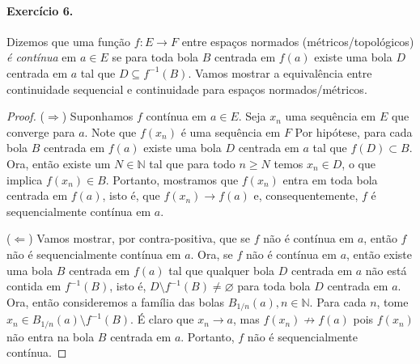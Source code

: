 \documentclass[12pt,a4paper]{article}
\begin{document}
\paragraph{Exercício 6.} Dizemos que uma função $f: E \to F$ entre espaços normados (métricos/topológicos) \textit{é contínua}
em $a\in E$ se para toda bola $B$ centrada em $f(a)$ existe uma bola $D$ centrada em $a$ tal que $D \subseteq f^{-1}(B)$. Vamos
mostrar a equivalência entre continuidade sequencial e continuidade para espaços normados/métricos.
\begin{proof}
($\Rightarrow$) Suponhamos $f$ contínua em $a\in E$. Seja $x_n$ uma sequência em $E$ que converge para $a$. Note que $f(x_n)$ 
é uma sequência em $F$ Por hipótese, para cada bola $B$ centrada em $f(a)$ existe uma bola $D$ centrada em $a$ tal que 
$f(D) \subset B$. Ora, então existe um $N\in\mathbb{N}$ tal que para todo $n\geq N$ temos $x_n \in D$, 
o que implica $f(x_n) \in B$. Portanto, mostramos que $f(x_n)$ entra em toda bola centrada em $f(a)$, isto é, que
$f(x_n) \to f(a)$ e, consequentemente, $f$ é sequencialmente contínua em $a$.

($\Leftarrow$) Vamos mostrar, por contra-positiva, que se $f$ não é contínua em $a$, então $f$ não é sequencialmente contínua em $a$. 
Ora, se $f$ não é contínua em $a$, então existe uma bola $B$ centrada em $f(a)$ tal que qualquer bola $D$ centrada em $a$ não está
contida em $f^{-1}(B)$, isto é, $D\setminus f^{-1}(B) \neq\varnothing$ para toda bola $D$ centrada em $a$. 
Ora, então consideremos a família das bolas $B_{1/n}(a), n\in\mathbb{N}$. Para cada $n$, 
tome $x_n \in B_{1/n}(a)\setminus f^{-1}(B)$. É claro que $x_n \to a$, mas $f(x_n) \not\to f(a)$ pois $f(x_n)$ não entra na bola
$B$ centrada em $a$. Portanto, $f$ não é sequencialmente contínua.
\end{proof}
\end{document}
